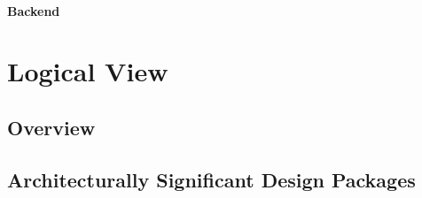 \documentclass[a4paper,12pt,chapterprefix=false,bibliography=totoc,listof=totoc,]{scrreprt}
\begin{document}
\subsubsection{Backend}

\chapter{Logical View}

\section{Overview}

\section{Architecturally Significant Design Packages}
\end{document}
